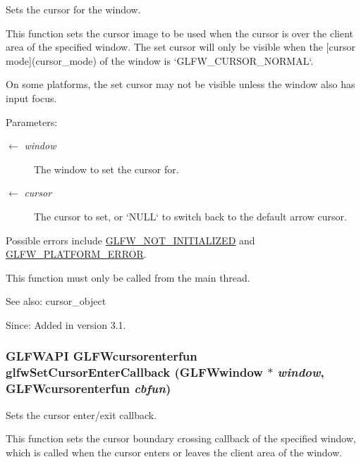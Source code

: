 Sets the cursor for the window. 

This function sets the cursor image to be used when the cursor is over the client area of the specified window. The set cursor will only be visible when the \mbox{[}cursor mode\mbox{]}(cursor\_\-mode) of the window is `GLFW\_\-CURSOR\_\-NORMAL`.

On some platforms, the set cursor may not be visible unless the window also has input focus.

\begin{Desc}
\item[Parameters:]
\begin{description}
\item[\mbox{$\leftarrow$} {\em window}]The window to set the cursor for. \item[\mbox{$\leftarrow$} {\em cursor}]The cursor to set, or `NULL` to switch back to the default arrow cursor.\end{description}
\end{Desc}
Possible errors include \hyperlink{group__errors_g2374ee02c177f12e1fa76ff3ed15e14a}{GLFW\_\-NOT\_\-INITIALIZED} and \hyperlink{group__errors_gd44162d78100ea5e87cdd38426b8c7a1}{GLFW\_\-PLATFORM\_\-ERROR}.

This function must only be called from the main thread.

\begin{Desc}
\item[See also:]cursor\_\-object\end{Desc}
\begin{Desc}
\item[Since:]Added in version 3.1. \end{Desc}
\hypertarget{group__input_ga20014985561efeb2c53f1956f727830}{
\subsubsection[glfwSetCursorEnterCallback]{\setlength{\rightskip}{0pt plus 5cm}GLFWAPI {\bf GLFWcursorenterfun} glfwSetCursorEnterCallback ({\bf GLFWwindow} $\ast$ {\em window}, \/  {\bf GLFWcursorenterfun} {\em cbfun})}}
\label{group__input_ga20014985561efeb2c53f1956f727830}


Sets the cursor enter/exit callback. 

This function sets the cursor boundary crossing callback of the specified window, which is called when the cursor enters or leaves the client area of the window.

